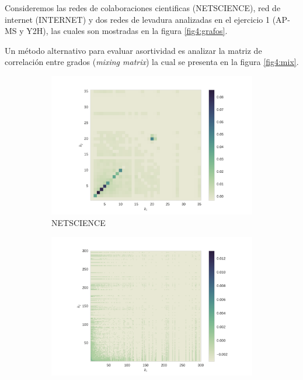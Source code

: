 Consideremos las redes de colaboraciones cientificas (NETSCIENCE), red de internet (INTERNET) y dos redes de levadura analizadas 
en el ejercicio 1 (AP-MS y Y2H), las cuales son mostradas en la figura \ref{fig4:grafos}.


Un m\'etodo alternativo para 
evaluar asortividad es analizar la matriz de correlaci\'on entre grados (\textit{mixing matrix}) la cual se presenta en
la figura \ref{fig4:mix}.


\begin{figure}[!ht]
    \centering
    \begin{subfigure}[b]{0.45\columnwidth}
        \includegraphics[width=\textwidth]{./schemes/mixing_netscience-gml.pdf}
        \caption{\label{fig4:NETSCIENCE}NETSCIENCE}
    \end{subfigure}
    \begin{subfigure}[b]{0.45\columnwidth}
        \includegraphics[width=\textwidth]{./schemes/mixing_as-22july06-gml.pdf}

\end{subfigure}
\end{figure}
